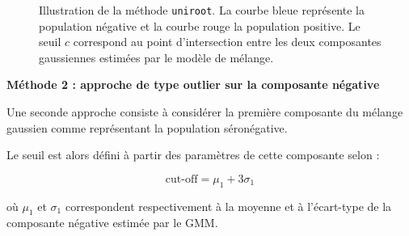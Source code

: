 \documentclass[a4paper]{article}
\begin{document}
\begin{figure}[H]
\centering
{}
\caption{Illustration de la méthode \texttt{uniroot}. La courbe bleue représente la population négative et la courbe rouge la population positive. Le seuil $c$ correspond au point d'intersection entre les deux composantes gaussiennes estimées par le modèle de mélange.}
\label{fig:cutoff_uniroot}
\end{figure}

\textbf{Méthode 2 : approche de type outlier sur la composante négative}

Une seconde approche consiste à considérer la première composante du mélange gaussien comme représentant la population séronégative.

Le seuil est alors défini à partir des paramètres de cette composante selon :

\[
\text{cut-off}
=
\mu_1 + 3\sigma_1
\]

où $\mu_1$ et $\sigma_1$ correspondent respectivement à la moyenne et à l’écart-type de la composante négative estimée par le GMM.
\end{document}
